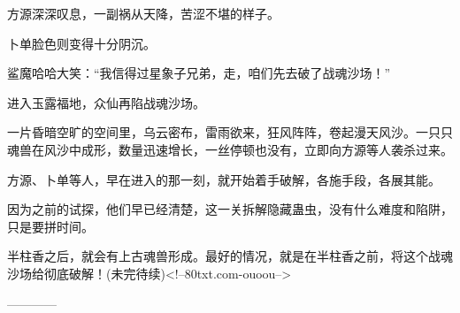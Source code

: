 \begin{this_body}
方源深深叹息，一副祸从天降，苦涩不堪的样子。

卜单脸色则变得十分阴沉。

鲨魔哈哈大笑：“我信得过星象子兄弟，走，咱们先去破了战魂沙场！”

进入玉露福地，众仙再陷战魂沙场。

一片昏暗空旷的空间里，乌云密布，雷雨欲来，狂风阵阵，卷起漫天风沙。一只只魂兽在风沙中成形，数量迅速增长，一丝停顿也没有，立即向方源等人袭杀过来。

方源、卜单等人，早在进入的那一刻，就开始着手破解，各施手段，各展其能。

因为之前的试探，他们早已经清楚，这一关拆解隐藏蛊虫，没有什么难度和陷阱，只是要拼时间。

半柱香之后，就会有上古魂兽形成。最好的情况，就是在半柱香之前，将这个战魂沙场给彻底破解！(未完待续)<!--80txt.com-ouoou-->

------------

\end{this_body}


